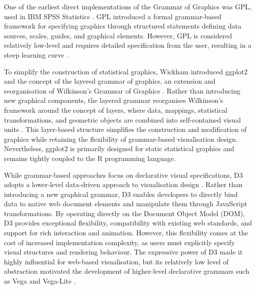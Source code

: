 One of the earliest direct implementations of the Grammar of Graphics was GPL, used in IBM SPSS Statistics \cite{ibm2023gpl}. GPL introduced a formal grammar-based framework for specifying graphics through structured statements defining data sources, scales, guides, and graphical elements. However, GPL is considered relatively low-level and requires detailed specification from the user, resulting in a steep learning curve \cite{hannan2024vizer}.

To simplify the construction of statistical graphics, Wickham introduced ggplot2 and the concept of the layered grammar of graphics, an extension and reorganisation of Wilkinson’s Grammar of Graphics \cite{wickham2011ggplot2,wickham2016ggplot2}. Rather than introducing new graphical components, the layered grammar reorganises Wilkinson's framework around the concept of layers, where data, mappings, statistical transformations, and geometric objects are combined into self-contained visual units \cite{wickham2010layered}.  This layer-based structure simplifies the construction and modification of graphics while retaining the flexibility of grammar-based visualisation design. Nevertheless, ggplot2 is primarily designed for static statistical graphics and remains tightly coupled to the R programming language.

While grammar-based approaches focus on declarative visual specifications, D3 adopts a lower-level data-driven approach to visualisation design \cite{bostock2011d3}. Rather than introducing a new graphical grammar, D3 enables developers to directly bind data to native web document elements and manipulate them through JavaScript transformations. By operating directly on the Document Object Model (DOM), D3 provides exceptional flexibility, compatibility with existing web standards, and support for rich interaction and animation\cite{bostock2011d3}. However, this flexibility comes at the cost of increased implementation complexity, as users must explicitly specify visual structures and rendering behaviour. The expressive power of D3 made it highly influential for web-based visualisation, but its relatively low level of abstraction motivated the development of higher-level declarative grammars such as Vega \cite{vega2025} and Vega-Lite \cite{satyanarayan2016vega}.

